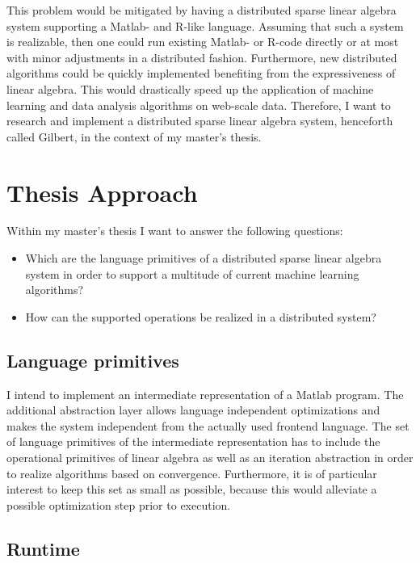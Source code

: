 \documentclass{dima}
\begin{document}
This problem would be mitigated by having a distributed sparse linear algebra system supporting a Matlab- and R-like language.
Assuming that such a system is realizable, then one could run existing Matlab- or R-code directly or at most with minor adjustments in a distributed fashion.
Furthermore, new distributed algorithms could be quickly implemented benefiting from the expressiveness of linear algebra.
This would drastically speed up the application of machine learning and data analysis algorithms on web-scale data.
Therefore, I want to research and implement a distributed sparse linear algebra system, henceforth called Gilbert, in the context of my master's thesis.


\section{Thesis Approach}

Within my master's thesis I want to answer the following questions:
\begin{itemize}
\item Which are the language primitives of a distributed sparse linear algebra system in order to support a multitude of current machine learning algorithms?
\item How can the supported operations be realized in a distributed system?
\end{itemize}

\subsection{Language primitives}

I intend to implement an intermediate representation of a Matlab program.
The additional abstraction layer allows language independent optimizations and makes the system independent from the actually used frontend language.
The set of language primitives of the intermediate representation has to include the operational primitives of linear algebra as well as an iteration abstraction in order to realize algorithms based on convergence.
Furthermore, it is of particular interest to keep this set as small as possible, because this would alleviate a possible optimization step prior to execution.

\subsection{Runtime}
\end{document}
